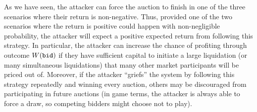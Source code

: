 \documentclass[a4paper,10pt]{article}
\begin{document}
\par As we have seen, the attacker can force the auction to finish in one of the three scenarios where their return is non-negative. Thus, provided one of the two scenarios where the return is positive could happen with non-negligible probability, the attacker will expect a positive expected return from following this strategy. In particular, the attacker can increase the chance of profiting through outcome $W({\tt bid})$ if they have sufficient capital to initiate a large liquidation (or many simultaneous liquidations) that many other market participants will be priced out of. Moreover, if the attacker ``griefs'' the system by following this strategy repeatedly and winning every auction, others may be discouraged from participating in future auctions (in game terms, the attacker is always able to force a draw, so competing bidders might choose not to play).

\newpage
\end{document}
